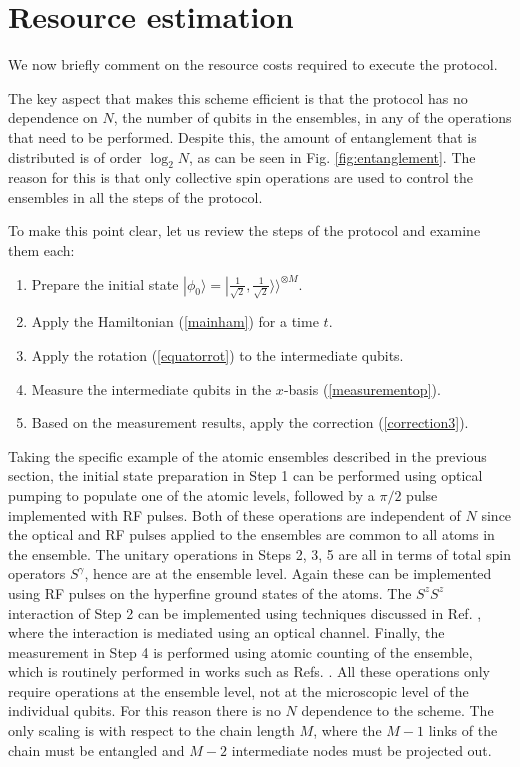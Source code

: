 \documentclass{WileyMSP-template}
\begin{document}
\section{Resource estimation}

We now briefly comment on the resource costs required to execute the protocol.  {%
The key aspect that makes this scheme efficient is that the protocol has no dependence on $ N $, the number of qubits in the ensembles, in any of the operations that need to be performed.  Despite this, the amount of entanglement that is distributed is of order $ \log_2 N $, as can be seen in Fig. \ref{fig:entanglement}.  The reason for this is that only collective spin operations are used to control the ensembles in all the steps of the protocol.

To make this point clear, let us review the steps of the protocol and examine them each:
%
\begin{enumerate}
\item Prepare the initial state $ | \phi_0 \rangle = |\frac{1}{\sqrt{2}}, \frac{1}{\sqrt{2}} \rangle \rangle^{\otimes M} $.
\item Apply the Hamiltonian (\ref{mainham}) for a time $ t $.
\item Apply the rotation (\ref{equatorrot}) to the intermediate qubits.
\item Measure the intermediate qubits in the $ x $-basis (\ref{measurementop}).
\item Based on the measurement results, apply the correction (\ref{correction3}).
\end{enumerate}

Taking the specific example of the atomic ensembles described in the previous section,  the initial state preparation in Step 1 can be performed  using optical pumping to populate one of the atomic levels, followed by a $ \pi/2 $ pulse implemented with RF pulses. Both of these operations are independent of $ N $ since the optical and RF pulses applied to the ensembles are common to all atoms in the ensemble.  The unitary operations in Steps 2, 3, 5 are all in terms of total spin operators $ S^\gamma $, hence are at the ensemble level. Again these can be implemented using RF pulses on the hyperfine ground states of the atoms.  The $ S^z S^z $ interaction of Step 2 can be implemented using techniques discussed in Ref. \cite{pyrkov2013entanglement,hussain2014geometric}, where the interaction is mediated using an optical channel.  Finally, the measurement in Step 4 is performed using atomic counting of the ensemble, which is routinely performed in works such as Refs. \cite{Hume2013,Ott2016,Qu2020}.  All these operations only require operations at the ensemble level, not at the microscopic level of the individual qubits.  For this reason there is no $ N $ dependence to the scheme.  The only scaling is with respect to the chain length $ M $, where the $ M - 1 $ links of the chain must be entangled and $ M - 2$ intermediate nodes must be projected out.





}
\end{document}
